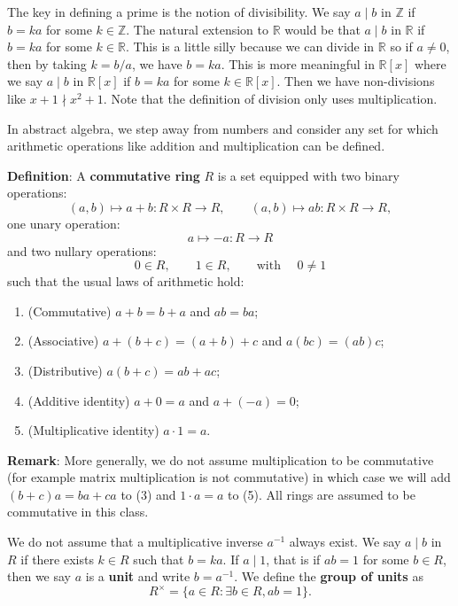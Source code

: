 \documentclass{article}
\def\Z{{\mathbb Z}}
\def\R{{\mathbb R}}
\def\Z{{\mathbb Z}}
\begin{document}
The key in defining a prime is the notion of divisibility. We say $a\mid b$ in $\Z$ if $b = ka$ for some $k\in\Z$. The natural extension to $\R$ would be that $a\mid b$ in $\R$ if $b = ka$ for some $k\in\R$. This is a little silly because we can divide in $\R$ so if $a\neq 0$, then by taking $k = b/a$, we have $b = ka$. This is more meaningful in $\R[x]$ where we say $a\mid b$ in $\R[x]$ if $b = ka$ for some $k\in \R[x]$. Then we have non-divisions like $x+1 \nmid x^2 + 1$. Note that the definition of division only uses multiplication.

In abstract algebra, we step away from numbers and consider any set for which arithmetic operations like addition and multiplication can be defined.

\vspace{5pt}
\noindent\textbf{Definition}: A \textbf{commutative ring} $R$ is a set equipped with two binary operations: $$(a,b)\mapsto a+b:R\times R\rightarrow R,\qquad (a,b)\mapsto ab:R\times R\rightarrow R,$$
one unary operation: $$a\mapsto -a: R\rightarrow R$$
and two nullary operations: $$0\in R,\qquad 1\in R,\qquad\mbox{with    }\quad0\neq 1$$
such that the usual laws of arithmetic hold:
\begin{enumerate}[(1)]
    \item (Commutative) $a + b = b + a$ and $ab = ba$;
    \item (Associative) $a + (b + c) = (a + b) + c$ and $a(bc) = (ab)c$;
    \item (Distributive) $a(b + c) = ab + ac$;
    \item (Additive identity) $a + 0 = a$ and $a + (-a) = 0$;
    \item (Multiplicative identity) $a\cdot 1 = a$.
\end{enumerate}

\noindent\textbf{Remark}: More generally, we do not assume multiplication to be commutative (for example matrix multiplication is not commutative) in which case we will add $(b+c)a = ba + ca$ to (3) and $1\cdot a = a$ to (5). All rings are assumed to be commutative in this class. 

\vspace{5pt}
We do not assume that a multiplicative inverse $a^{-1}$ always exist. We say $a\mid b$ in $R$ if there exists $k\in R$ such that $b = ka$. If $a\mid 1$, that is if $ab = 1$ for some $b\in R$, then we say $a$ is a \textbf{unit} and write $b = a^{-1}$. We define the \textbf{group of units} as $$R^\times = \{a\in R\colon \exists b\in R, ab = 1\}.$$
\end{document}
